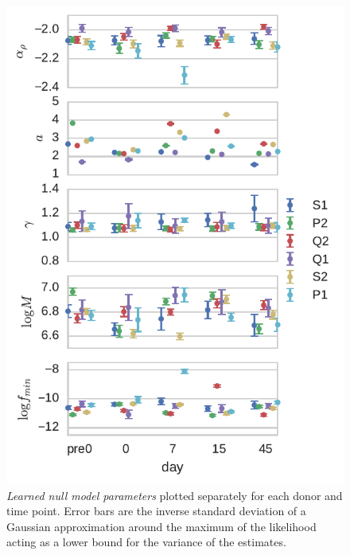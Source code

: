 \documentclass[letterpaper,english,prl,reprint,longbibliography]{revtex4-1} %
\begin{document}
\begin{figure}[ht!]
\includegraphics{fig3_learnednullparas}
\centering{}
\caption{
\emph{Learned null model parameters} plotted separately for each donor and time point. Error bars are the inverse standard deviation of a Gaussian approximation around the maximum of the likelihood acting as a lower bound for the variance of the estimates. 
\label{fig:nullparas_timeseries}}
\end{figure}
\end{document}
